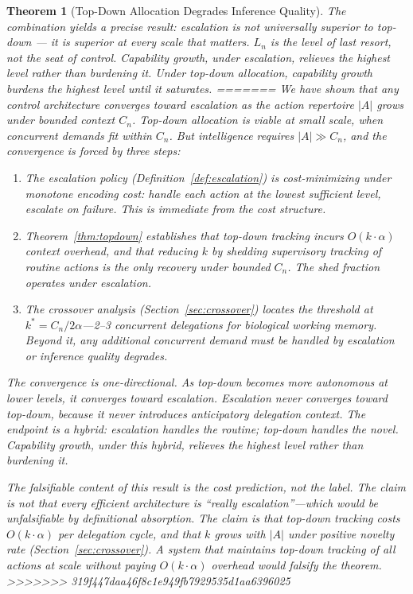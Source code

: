 \documentclass[11pt]{article}
\newtheorem{theorem}{Theorem}
\theoremstyle{definition}
\begin{document}
\begin{theorem}[Top-Down Allocation Degrades Inference Quality]
The combination yields a precise result: escalation is not universally
superior to top-down --- it is superior at every scale that matters.
$L_n$ is the level of last resort, not the seat of control.
Capability growth, under escalation, \emph{relieves} the highest level
rather than burdening it. Under top-down allocation, capability growth
\emph{burdens} the highest level until it saturates.
=======
We have shown that any control architecture converges toward
escalation as the action repertoire $|A|$ grows under bounded context
$C_n$. Top-down allocation is viable at small scale, when concurrent
demands fit within $C_n$. But intelligence requires $|A| \gg C_n$,
and the convergence is forced by three steps:

\begin{enumerate}
\item The escalation policy (Definition~\ref{def:escalation}) is
   cost-minimizing under monotone encoding cost: handle each action at
   the lowest sufficient level, escalate on failure. This is immediate
   from the cost structure.

\item Theorem~\ref{thm:topdown} establishes that top-down tracking
   incurs $O(k \cdot \alpha)$ context overhead, and that reducing $k$
   by shedding supervisory tracking of routine actions is the only
   recovery under bounded $C_n$. The shed fraction operates under
   escalation.

\item The crossover analysis (Section~\ref{sec:crossover}) locates the
   threshold at $k^* = C_n / 2\alpha$---2--3 concurrent delegations
   for biological working memory. Beyond it, any additional concurrent
   demand must be handled by escalation or inference quality degrades.
\end{enumerate}

The convergence is one-directional. As top-down becomes more
autonomous at lower levels, it converges toward escalation.
Escalation never converges toward top-down, because it never
introduces anticipatory delegation context. The endpoint is a hybrid:
escalation handles the routine; top-down handles the novel. Capability
growth, under this hybrid, \emph{relieves} the highest level rather
than burdening it.

The falsifiable content of this result is the \emph{cost prediction},
not the label. The claim is not that every efficient architecture is
``really escalation''---which would be unfalsifiable by definitional
absorption. The claim is that top-down tracking costs $O(k \cdot
\alpha)$ per delegation cycle, and that $k$ grows with $|A|$ under
positive novelty rate (Section~\ref{sec:crossover}). A system that
maintains top-down tracking of all actions at scale without paying
$O(k \cdot \alpha)$ overhead would falsify the theorem.
>>>>>>> 319f447daa46f8c1e949fb7929535d1aa6396025


\end{theorem}
\end{document}
